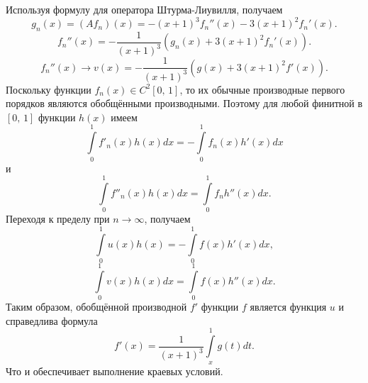 \documentclass[a4paper]{article}
\begin{document}
\begin{sol}
Используя формулу для оператора Штурма-Лиувилля, получаем
\[
	g_n(x)=(Af_n)(x)=-(x+1)^3 f_n''(x)-3(x+1)^2f_n'(x)
.\] 
\[
	f_n''(x)=-\frac{1}{(x+1)^3}\left( g_n(x)+3(x+1)^2f_n'(x) \right) 
.\] 
\[
	f_{n}''(x)\to v(x)= -\frac{1}{(x+1)^3}\left( g(x)+
	3(x+1)^2f'(x)\right) 
.\] 
Поскольку функции $f_{n}(x) \in C^2[0,\,1]$, то их обычные
производные первого порядков являются обобщёнными производными.
Поэтому для любой финитной в $[0,\,1]$ функции $h(x)$ имеем
\[
	\int\limits_{0}^{1} f'_n(x)h(x)dx=-
	\int\limits_{0}^{1} f_n(x)h'(x)dx 
\]
и
\[
	\int\limits_{0}^{1} f''_n(x)h(x)dx= \int\limits_{0}^{1} 
	f_n h''(x)dx
.\] 
Переходя к пределу при $n\to \infty$, получаем
\[
	\int\limits_{0}^{1} u(x)h(x)= - \int\limits_{0}^{1} f(x)
	h'(x)dx
 ,\]
\[
	\int\limits_{0}^{1} v(x)h(x)dx= \int\limits_{0}^{1} f(x)
	h''(x)dx
.\] 
Таким образом, обобщённой производной $f'$ функции $f$ является
функция $u$ и справедлива формула
\[
	f'(x)=\frac{1}{(x+1)^3}\int\limits_{x}^{1} g(t)dt 
.\] 
Что и обеспечивает выполнение краевых условий.
\end{sol}
\end{document}
